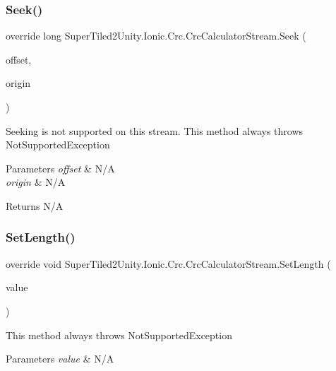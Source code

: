 \subsubsection{\texorpdfstring{Seek()}{Seek()}}
{\footnotesize\ttfamily override long Super\+Tiled2\+Unity.\+Ionic.\+Crc.\+Crc\+Calculator\+Stream.\+Seek (\begin{DoxyParamCaption}\item[{long}]{offset,  }\item[{System.\+I\+O.\+Seek\+Origin}]{origin }\end{DoxyParamCaption})}



Seeking is not supported on this stream. This method always throws Not\+Supported\+Exception 


\begin{DoxyParams}{Parameters}
{\em offset} & N/A\\
\hline
{\em origin} & N/A\\
\hline
\end{DoxyParams}
\begin{DoxyReturn}{Returns}
N/A
\end{DoxyReturn}
\mbox{\label{class_super_tiled2_unity_1_1_ionic_1_1_crc_1_1_crc_calculator_stream_a4b3bc7f1c16f514f7ae549c2175a15ae}} 
\subsubsection{\texorpdfstring{Set\+Length()}{SetLength()}}
{\footnotesize\ttfamily override void Super\+Tiled2\+Unity.\+Ionic.\+Crc.\+Crc\+Calculator\+Stream.\+Set\+Length (\begin{DoxyParamCaption}\item[{long}]{value }\end{DoxyParamCaption})}



This method always throws Not\+Supported\+Exception 


\begin{DoxyParams}{Parameters}
{\em value} & N/A\\
\hline
\end{DoxyParams}
\mbox{\label{class_super_tiled2_unity_1_1_ionic_1_1_crc_1_1_crc_calculator_stream_a74d764a6d8b8697dd938780fe39cb9ee}} 
